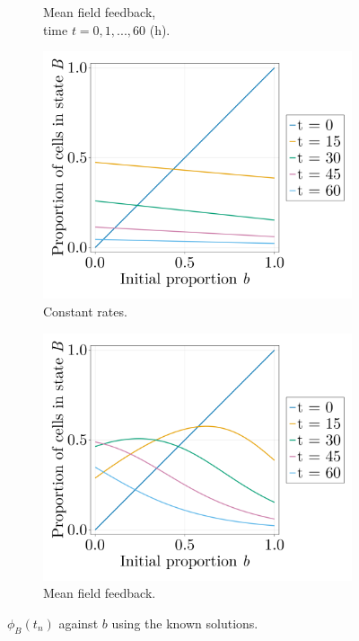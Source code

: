 \begin{figure}[ht]
\begin{subfigure}{0.47\textwidth}
        \caption{Mean field feedback,\\time $t=0,1,...,60$ (h).}
        \label{fig:phib-solutions-2}
    \end{subfigure}
    \begin{subfigure}{0.47\textwidth}
        \centering
        \includegraphics[width=\textwidth]{figures/407/407-phib-vs-b-solution-constant.png}
        \caption{Constant rates.}
        \label{fig:phib-solutions-3}
    \end{subfigure}
    \hfill
    \begin{subfigure}{0.47\textwidth}
        \centering
        \includegraphics[width=\textwidth]{figures/407/407-phib-vs-b-solution-meanfield.png}
        \caption{Mean field feedback.}
        \label{fig:phib-solutions-4}
    \end{subfigure}
    \caption{$\phi_B(t_n)$ against $b$ using the known solutions.}
    \label{fig:phib-solutions}
\end{figure}


